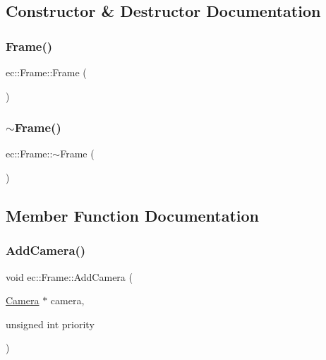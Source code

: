 \subsection{Constructor \& Destructor Documentation}
\mbox{\label{classec_1_1_frame_a80ed1da85818f646b6b80fb6c8a6c2a6}} 
\subsubsection{\texorpdfstring{Frame()}{Frame()}}
{\footnotesize\ttfamily ec\+::\+Frame\+::\+Frame (\begin{DoxyParamCaption}{ }\end{DoxyParamCaption})\hspace{0.3cm}{\ttfamily [explicit]}}

\mbox{\label{classec_1_1_frame_af2b2c733cacb47d99e460a2b75667eaa}} 
\subsubsection{\texorpdfstring{$\sim$\+Frame()}{~Frame()}}
{\footnotesize\ttfamily ec\+::\+Frame\+::$\sim$\+Frame (\begin{DoxyParamCaption}{ }\end{DoxyParamCaption})}



\subsection{Member Function Documentation}
\mbox{\label{classec_1_1_frame_a038fc1d43f9c11fb6d1c8a7c2127d55f}} 
\subsubsection{\texorpdfstring{Add\+Camera()}{AddCamera()}}
{\footnotesize\ttfamily void ec\+::\+Frame\+::\+Add\+Camera (\begin{DoxyParamCaption}\item[{\mbox{\hyperlink{classec_1_1_camera}{Camera}} $\ast$}]{camera,  }\item[{unsigned int}]{priority }\end{DoxyParamCaption})}

